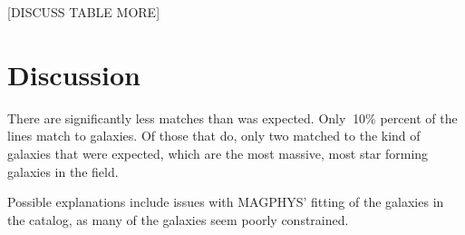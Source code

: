 [DISCUSS TABLE MORE]


\section{Discussion}

There are significantly less matches than was expected. Only $~$10\% percent of the lines match to galaxies. Of those that do, only two matched to the kind of galaxies that were expected, which are the most massive, most star forming galaxies in the field. 

Possible explanations include issues with MAGPHYS' fitting of the galaxies in the catalog, as many of the galaxies seem poorly constrained. 